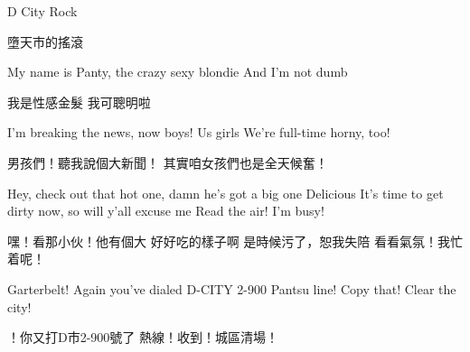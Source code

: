 \begin{paracol}{2}

    \setlength{\columnsep}{3em}
    \setlength{\columnseprule}{0.1pt}

    {\Huge D City Rock}

    \vspace{2em}

    \switchcolumn

    {\Huge 墮天市的搖滾}

    \vspace{2em}

    \switchcolumn*

    \bgroup\obeylines

        My name is Panty, the crazy sexy blondie
        And I'm not dumb

        \switchcolumn
        我是性感金髮
        我可聰明啦
        \switchcolumn*

        I'm breaking the news, now boys! Us girls
        We're full-time horny, too!

        \vspace{3em}

        \switchcolumn
        男孩們！聽我說個大新聞！
        其實咱女孩們也是全天候奮！

        \vspace{3em}
        \switchcolumn*

        Hey, check out that hot one, damn he's got a big one
        Delicious
        It's time to get dirty now, so will y'all excuse me
        Read the air! I'm busy!

        \vspace{3em}

        \switchcolumn
        嘿！看那小伙！他有個大
        好好吃的樣子啊
        是時候污了，恕我失陪
        看看氣氛！我忙着呢！

        \vspace{3em}
        \switchcolumn*

        Garterbelt! Again you've dialed D-CITY 2-900
        Pantsu line! Copy that! Clear the city!

        \vspace{3em}

        \switchcolumn
        ！你又打D市2-900號了
        熱線！收到！城區清場！


\end{paracol}
